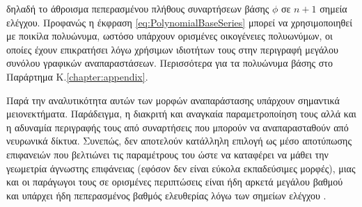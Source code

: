     δηλαδή το άθροισμα πεπερασμένου πλήθους συναρτήσεων βάσης $\phi$ σε $n+1$ σημεία ελέγχου. Προφανώς η έκφραση \ref{eq:PolynomialBaseSeries} μπορεί να χρησιμοποιηθεί με ποικίλα πολυώνυμα, ωστόσο υπάρχουν ορισμένες οικογένειες πολυωνύμων, οι οποίες έχουν επικρατήσει λόγω χρήσιμων ιδιοτήτων τους στην περιγραφή μεγάλου συνόλου γραφικών αναπαραστάσεων. Περισσότερα για τα πολυώνυμα βάσης στο Παράρτημα Κ.\ref{chapter:appendix}.
    
\par    
    Παρά την αναλυτικότητα αυτών των μορφών αναπαράστασης υπάρχουν σημαντικά μειονεκτήματα. Παράδειγμα, η διακριτή και αναγκαία παραμετροποίηση τους αλλά και η αδυναμία περιγραφής τους από συναρτήσεις που μπορούν να αναπαρασταθούν από νευρωνικά δίκτυα. Συνεπώς, δεν αποτελούν κατάλληλη επιλογή ως μέσο αποτύπωσης επιφανειών που βελτιώνει τις παραμέτρους του ώστε να καταφέρει να μάθει την γεωμετρία άγνωστης επιφάνειας (εφόσον δεν είναι εύκολα εκπαδεύσιμες μορφές), μιας και οι παράγωγοι τους σε ορισμένες περιπτώσεις είναι ήδη αρκετά μεγάλου βαθμού και υπάρχει ήδη πεπερασμένος βαθμός ελευθερίας λόγω των σημείων ελέγχου \cite{winkel2001generalized}.
